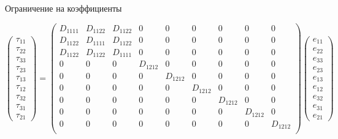 \documentclass{beamer}
\begin{document}
{\begin{exampleblock}{Ограничение на коэффициенты}
{			\hspace{-0.7cm}
			\parbox{\textwidth}{
				\scriptsize
				\[
				\begin{pmatrix}
				\tau_{11} \\
				\tau_{22}\\
				\tau_{33} \\
				\tau_{23} \\
				\tau_{13} \\
				\tau_{12} \\
				\tau_{32} \\
				\tau_{31} \\
				\tau_{21} 
				\end{pmatrix}
				=
				\begin{pmatrix}
				D_{1111} & D_{1122}  & D_{1122} & 0 & 0 & 0 &0 & 0& 0\\
				D_{1122} & D_{1111}  & D_{1122} & 0 &0 & 0 & 0 & 0& 0\\
				D_{1122} & D_{1122}  & D_{1111} & 0 & 0 & 0 & 0 &0& 0\\
				0 & 0  & 0 & D_{1212} & 0 & 0 & 0 & 0 & 0\\
				0 & 0  & 0 & 0 & D_{1212} & 0 & 0 & 0 & 0\\
				0 & 0  & 0 & 0 & 0 & D_{1212} & 0 & 0 & 0\\
				0 & 0  & 0 & 0 & 0 & 0 & D_{1212} & 0 & 0\\
				0 & 0  & 0 & 0 & 0 & 0 & 0 & D_{1212} & 0\\
				0 & 0 & 0 & 0 & 0 & 0 & 0 & 0 & D_{1212}\\	
				\end{pmatrix}
				\begin{pmatrix}
				e_{11} \\
				e_{22}\\
				e_{33} \\
				e_{23} \\
				e_{13} \\
				e_{12} \\
				e_{32} \\
				e_{31} \\
				e_{21} 
				\end{pmatrix}
				\]
			}
			
		}
		
	\end{exampleblock}
}
\end{document}
